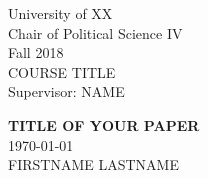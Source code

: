 


\begin{titlepage} %

	
\begin{minipage}{0.4\textwidth} %
    \begin{flushleft} %
    \large
    University of XX\\ %
    Chair of Political Science IV\\ %
    Fall 2018\\ %
    COURSE TITLE\\ %
    Supervisor: NAME %
    \end{flushleft}
\end{minipage}
	
\vspace*{2in} %
	
\center %

	
{\huge\bfseries TITLE OF YOUR PAPER}\\[0.4cm] %
{\large\today}\\[0.4cm] %
FIRSTNAME LASTNAME %
	
\vfill %


\vfill %


\end{titlepage}
